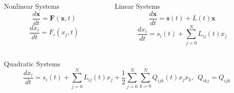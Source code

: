 \begin{columns}
\begin{column}{0.47\textwidth}
\vspace{-0.34in}
\begin{block}{Nonlinear Systems}
\begin{equation*}
\frac{d \mathbf{x}}{dt}
= \mathbf{F} \left( \mathbf{x}, t \right)
\end{equation*}
\begin{equation*}
\frac{dx_i}{dt}
= F_i \left( x_j, t \right)
\end{equation*}
\end{block}
\vspace{-0.14in}
\end{column}
\begin{column}{0.47\textwidth}
\vspace{-0.34in}
\begin{block}{Linear Systems}
\begin{equation*}
\frac{d \mathbf{x}}{dt}
= \mathbf{s} \left( t \right) + L \left( t \right) \mathbf{x}
\end{equation*}
\begin{equation*}
\frac{dx_i}{dt}
= s_i \left( t \right) + \sum_{j=0}^N L_{ij} \left( t \right) x_j
\end{equation*}
\end{block}
\end{column}
\end{columns}
\vspace{-0.06in}
\begin{block}{Quadratic Systems}
\vspace{-0.2in}
\begin{equation*}
\frac{dx_i}{dt}
= s_i \left( t \right) + \sum_{j=0}^N L_{ij} \left( t \right) x_j
+ \frac{1}{2} \sum_{j=0}^N \sum_{k=0}^N Q_{ijk} \left( t \right) x_j x_k,
\ \ Q_{ikj} = Q_{ijk}
\end{equation*}
\end{block}
